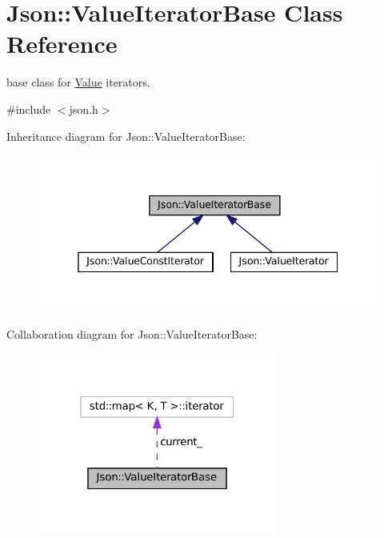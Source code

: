 \hypertarget{classJson_1_1ValueIteratorBase}{}\section{Json\+:\+:Value\+Iterator\+Base Class Reference}
\label{classJson_1_1ValueIteratorBase}


base class for \hyperlink{classJson_1_1Value}{Value} iterators.  




{\ttfamily \#include $<$json.\+h$>$}



Inheritance diagram for Json\+:\+:Value\+Iterator\+Base\+:
\nopagebreak
\begin{figure}[H]
\begin{center}
\leavevmode
\includegraphics[width=338pt]{classJson_1_1ValueIteratorBase__inherit__graph}
\end{center}
\end{figure}


Collaboration diagram for Json\+:\+:Value\+Iterator\+Base\+:
\nopagebreak
\begin{figure}[H]
\begin{center}
\leavevmode
\includegraphics[width=223pt]{classJson_1_1ValueIteratorBase__coll__graph}
\end{center}
\end{figure}

